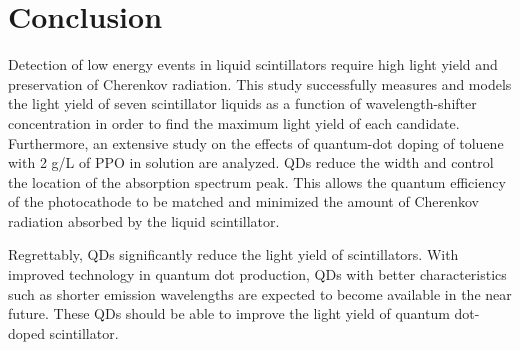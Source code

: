 \documentclass{JINST}
\begin{document}
\section{Conclusion}
Detection of low energy events in liquid scintillators require high light yield and preservation of Cherenkov radiation. This study  successfully measures and models the light yield of seven scintillator liquids as a function of wavelength-shifter concentration in order to find the maximum light yield of each candidate. Furthermore, an extensive study on the effects of quantum-dot doping of toluene with 2 g/L of PPO in solution are analyzed. QDs reduce the width and control the location of the absorption spectrum peak. This allows the quantum efficiency of the photocathode to be matched and minimized the amount of Cherenkov radiation absorbed by the liquid scintillator.

Regrettably, QDs significantly reduce the light yield of scintillators. With improved technology in quantum dot production, QDs with better characteristics such as shorter emission wavelengths are expected to become available in the near future. These QDs should be able to improve the light yield of quantum dot-doped scintillator. 
\end{document}
